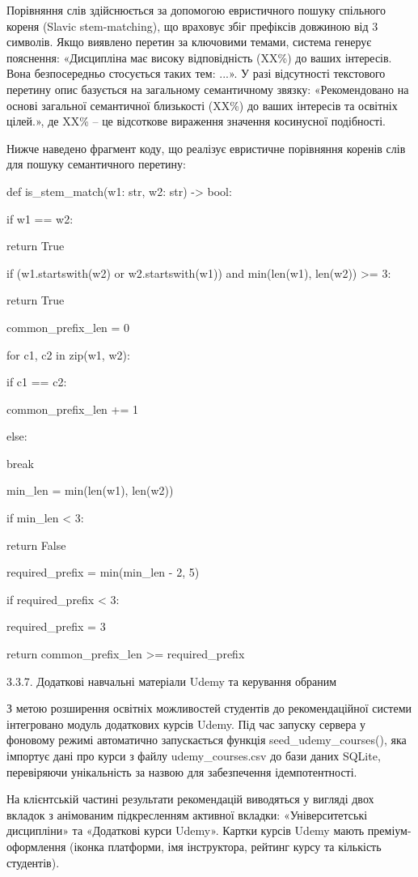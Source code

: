 \documentclass[
]{article}
\begin{document}
Порівняння слів здійснюється за допомогою евристичного пошуку спільного
кореня (Slavic stem-matching), що враховує збіг префіксів довжиною від 3
символів. Якщо виявлено перетин за ключовими темами, система генерує
пояснення: «Дисципліна має високу відповідність (XX\%) до ваших
інтересів. Вона безпосередньо стосується таких тем: ...». У разі
відсутності текстового перетину опис базується на загальному
семантичному зв\textquotesingle язку: «Рекомендовано на основі загальної
семантичної близькості (XX\%) до ваших інтересів та освітніх цілей.», де
XX\% -- це відсоткове вираження значення косинусної подібності.

Нижче наведено фрагмент коду, що реалізує евристичне порівняння коренів
слів для пошуку семантичного перетину:

def is\_stem\_match(w1: str, w2: str) -\textgreater{} bool:

if w1 == w2:

return True

if (w1.startswith(w2) or w2.startswith(w1)) and min(len(w1), len(w2))
\textgreater= 3:

return True

common\_prefix\_len = 0

for c1, c2 in zip(w1, w2):

if c1 == c2:

common\_prefix\_len += 1

else:

break

min\_len = min(len(w1), len(w2))

if min\_len \textless{} 3:

return False

required\_prefix = min(min\_len - 2, 5)

if required\_prefix \textless{} 3:

required\_prefix = 3

return common\_prefix\_len \textgreater= required\_prefix

3.3.7. Додаткові навчальні матеріали Udemy та керування обраним

З метою розширення освітніх можливостей студентів до рекомендаційної
системи інтегровано модуль додаткових курсів Udemy. Під час запуску
сервера у фоновому режимі автоматично запускається функція
seed\_udemy\_courses(), яка імпортує дані про курси з файлу
udemy\_courses.csv до бази даних SQLite, перевіряючи унікальність за
назвою для забезпечення ідемпотентності.

На клієнтській частині результати рекомендацій виводяться у вигляді двох
вкладок з анімованим підкресленням активної вкладки: «Університетські
дисципліни» та «Додаткові курси Udemy». Картки курсів Udemy мають
преміум-оформлення (іконка платформи, ім\textquotesingle я інструктора,
рейтинг курсу та кількість студентів).
\end{document}
